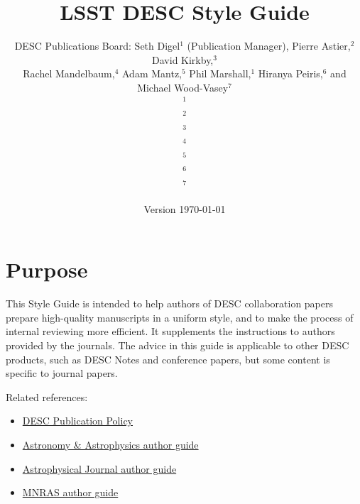 \documentclass[letterpaper,11pt]{article}
\newcommand*{\version}{Version \today}
\begin{document}

\title{\vspace{5cm}LSST DESC Style Guide}
\author{DESC Publications Board: Seth Digel$^1$ (Publication Manager), Pierre Astier,$^2$ David Kirkby,$^3$\\ Rachel Mandelbaum,$^4$ Adam Mantz,$^5$ Phil Marshall,$^1$ Hiranya Peiris,$^6$ and Michael Wood-Vasey$^7$
  \medskip\\
    {\small$^1$\slac}\\
    {\small$^2$}\\
    {\small$^3$}\\
    {\small$^4$}\\
    {\small$^5$\suphysics}\\
    {\small$^6$}\\
    {\small$^7$}
}
\date{\version}
\maketitle
\thispagestyle{fancy}

\clearpage
\fancyhead{}
\fancyhead[L]{\version}
\fancyhead[R]{\thepage}
\setcounter{page}{1}

\tableofcontents

\clearpage
\fancyhead[C]{\rightmark}
\setcounter{page}{1}

\section{Purpose}

This Style Guide is intended to help authors of DESC collaboration papers prepare
high-quality manuscripts in a uniform style, and to make the process of internal reviewing more efficient. It supplements the instructions
to authors provided by the journals.  The advice in this guide is applicable to other DESC products, such as DESC Notes and conference papers, but some content is specific to journal papers.

Related references:
\begin{itemize}
\item{\href{http://lsst-desc.org/sites/default/files/LSST_DESC_Publication_Policy_v6_15aug2016.pdf}{DESC Publication Policy}}

\item{\href{https://www.aanda.org/doc_journal/instructions/aadoc.pdf}{Astronomy \& Astrophysics author guide}}

\item{\href{http://journals.aas.org/authors/manuscript.html}{Astrophysical Journal author guide}}

\item \href{https://academic.oup.com/mnras/pages/General_Instructions}{MNRAS author guide}
\end{itemize}
\end{document}
